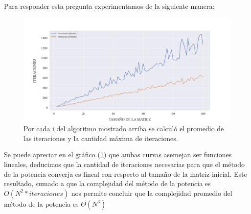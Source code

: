 \vspace{1em}
Para responder esta pregunta experimentamos de la siguiente manera:

\vspace{1em}

\vspace{1em}

\vspace{1em}
\begin{figure}[!htbp]
    \includegraphics[scale=0.45]{files/src/.media/op_experimento_iteraciones.png}
    \caption{Por cada i del algoritmo mostrado arriba se calculó el promedio de las iteraciones y la cantidad máxima de iteraciones.}
    \label{fig:iteraciones}
\end{figure}
\vspace{1em}

Se puede apreciar en el gráfico (\ref{fig:iteraciones}) que ambas curvas asemejan ser funciones lineales, deducimos que la cantidad de iteraciones necesarias para que el método de la potencia converja es lineal con respecto al tamaño de la matriz inicial.
Este resultado, sumado a que la complejidad del método de la potencia es $O(N^2 * iteraciones)$ nos permite concluir que la complejidad promedio del método de la potencia es $\Theta(N^3)$
